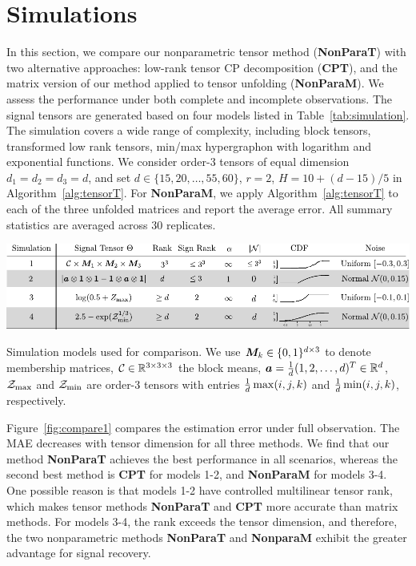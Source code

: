 \documentclass[11pt]{article}
\theoremstyle{plain}
\theoremstyle{definition}
\begin{document}
\section{Simulations}\label{sec:simulation}
In this section, we compare our nonparametric tensor method ({\bf NonParaT}) with two alternative approaches: low-rank tensor CP decomposition ({\bf CPT}), and the matrix version of our method applied to tensor unfolding ({\bf NonParaM}). We assess the performance under both complete and incomplete observations. The signal tensors are generated based on four models listed in Table~\ref{tab:simulation}. The simulation covers a wide range of complexity, including block tensors, transformed low rank tensors, min/max hypergraphon with logarithm and exponential functions. We consider order-3  tensors of equal dimension $d_1=d_2=d_3=d$, and set $d\in \{15, 20,\ldots,55,60\}$, $r=2$, $H=10+{(d-15)/ 5}$ in Algorithm~\ref{alg:tensorT}. For {\bf NonParaM}, we apply Algorithm~\ref{alg:tensorT} to each of the three unfolded matrices and report the average error. All summary statistics are averaged across $30$ replicates.  

\begin{table}[h]
\includegraphics[width=1\textwidth]{figure/simulation.pdf}
\caption{Simulation models used for comparison. We use $\bm M_k\in\{0,1\}^{d\times 3}$ to denote membership matrices, $\mathcal{C}\in\mathbb{R}^{3\times 3\times 3}$ the block means, $\bm{a}={1\over d}(1,2,\ldots,d)^T \in\mathbb{R}^d$, $\mathcal{Z}_{\max}$ and $\mathcal{Z}_{\min}$ are order-3 tensors with entries ${1\over d}\max(i,j,k)$ and ${1\over d}\min(i,j,k)$, respectively.}\label{tab:simulation}
\end{table}


Figure~\ref{fig:compare1} compares the estimation error under full observation. The MAE decreases with tensor dimension for all three methods. We find that our method {\bf NonParaT} achieves the best performance in all scenarios, whereas the second best method is {\bf CPT} for models 1-2, and {\bf NonParaM} for models 3-4. One possible reason is that models 1-2 have controlled multilinear tensor rank, which makes tensor methods {\bf NonParaT} and {\bf CPT} more accurate than matrix methods. For models 3-4, the rank exceeds the tensor dimension, and therefore, the two nonparametric methods {\bf NonParaT} and {\bf NonparaM} exhibit the greater advantage for signal recovery. 
\end{document}
